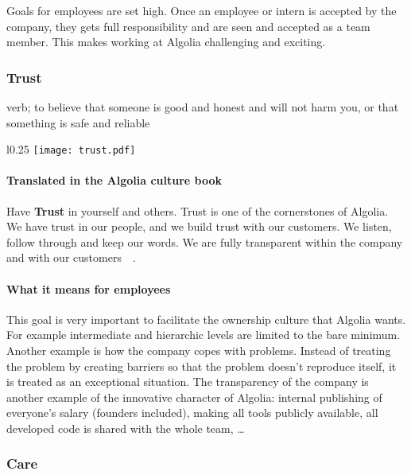 Goals for employees are set high. Once an employee or intern is accepted by the company, they gets full responsibility and are seen and accepted as a team member. This makes working at Algolia challenging and exciting.

\subsubsection{Trust}
\label{ssub:trust}

\begin{definition}
verb; to believe that someone is good and honest and will not harm you, or that something is safe and reliable\cite{cambridge-trust}
\end{definition}

\begin{wrapfigure}{l}{0.25\textwidth}
  \centering
  \texttt{[image: trust.pdf]}
\end{wrapfigure}

\paragraph{Translated in the Algolia culture book}

Have \textbf{Trust} in yourself and others. Trust is one of the cornerstones of Algolia. We have trust in our people, and we build trust with our customers. We listen, follow through and keep our words. We are fully transparent within the company and with our customers~\cite{algolia-careers}~.

\paragraph{What it means for employees}

This goal is very important to facilitate the ownership culture that Algolia wants. For example intermediate and hierarchic levels are limited to the bare minimum. Another example is how the company copes with problems. Instead of treating the problem by creating barriers so that the problem doesn't reproduce itself, it is treated as an exceptional situation. The transparency of the company is another example of the innovative character of Algolia: internal publishing of everyone's salary (founders included), making all tools publicly available, all developed code is shared with the whole team, \dots

\subsubsection{Care}
\label{ssub:care}

